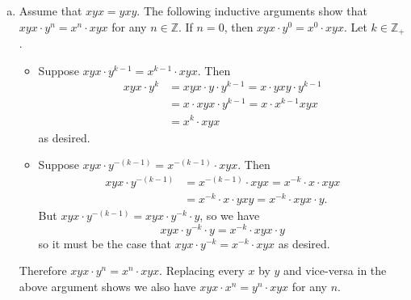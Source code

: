 \documentclass{article}
\begin{document}
\begin{Answer}
\begin{enumerate}[(a)]
  \item{
    Assume that $xyx = yxy$. The following inductive arguments show
    that $xyx \cdot y^n = x^n \cdot xyx$ for any $n \in \mathbb{Z}$.
    If $n = 0$, then $xyx \cdot y^0 = x^0 \cdot xyx$. Let $k \in \mathbb{Z}_+$.
    \begin{itemize}
      \item{
        Suppose $xyx \cdot y^{k-1} = x^{k-1} \cdot xyx$. Then
        \begin{align*}
             xyx \cdot y^k
          &= xyx \cdot y \cdot y^{k-1}
           = x \cdot yxy \cdot y^{k-1} \\
          &= x \cdot xyx \cdot y^{k-1}
           = x \cdot x^{k-1} xyx       \\
          &= x^k \cdot xyx
        \end{align*}
        as desired.
      }
      \item{
        Suppose $xyx \cdot y^{-(k-1)} = x^{-(k-1)} \cdot xyx$.
        Then
        \begin{align*}
             xyx \cdot y^{-(k-1)}
          &= x^{-(k-1)} \cdot xyx
           = x^{-k} \cdot x \cdot xyx \\
          &= x^{-k} \cdot x \cdot yxy
           = x^{-k} \cdot xyx \cdot y.
        \end{align*}
        But $xyx \cdot y^{-(k-1)} = xyx \cdot y^{-k} \cdot y$, so we
        have
        $$
        xyx \cdot y^{-k} \cdot y = x^{-k} \cdot xyx \cdot y
        $$
        so it must be the case that
        $xyx \cdot y^{-k} = x^{-k} \cdot xyx$ as desired.
      }
    \end{itemize}
    Therefore $xyx \cdot y^n = x^n \cdot xyx$. Replacing every $x$ by
    $y$ and vice-versa in the above argument shows we also have
    $xyx \cdot x^n = y^n \cdot xyx$ for any $n$.

}
\end{enumerate}
\end{Answer}
\end{document}
